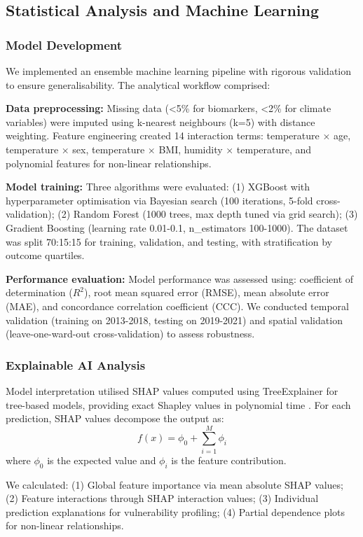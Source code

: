 \documentclass[11pt,a4paper]{article}
\begin{document}
\subsection{Statistical Analysis and Machine Learning}

\subsubsection{Model Development}

We implemented an ensemble machine learning pipeline with rigorous validation to ensure generalisability. The analytical workflow comprised:

\textbf{Data preprocessing:} Missing data (<5\% for biomarkers, <2\% for climate variables) were imputed using k-nearest neighbours (k=5) with distance weighting. Feature engineering created 14 interaction terms: temperature × age, temperature × sex, temperature × BMI, humidity × temperature, and polynomial features for non-linear relationships.

\textbf{Model training:} Three algorithms were evaluated: (1) XGBoost with hyperparameter optimisation via Bayesian search (100 iterations, 5-fold cross-validation); (2) Random Forest (1000 trees, max depth tuned via grid search); (3) Gradient Boosting (learning rate 0.01-0.1, n\_estimators 100-1000). The dataset was split 70:15:15 for training, validation, and testing, with stratification by outcome quartiles.

\textbf{Performance evaluation:} Model performance was assessed using: coefficient of determination ($R^2$), root mean squared error (RMSE), mean absolute error (MAE), and concordance correlation coefficient (CCC). We conducted temporal validation (training on 2013-2018, testing on 2019-2021) and spatial validation (leave-one-ward-out cross-validation) to assess robustness.

\subsubsection{Explainable AI Analysis}

Model interpretation utilised SHAP values computed using TreeExplainer for tree-based models, providing exact Shapley values in polynomial time \citep{Lundberg2020}. For each prediction, SHAP values decompose the output as:
$$f(x) = \phi_0 + \sum_{i=1}^{M} \phi_i$$
where $\phi_0$ is the expected value and $\phi_i$ is the feature contribution.

We calculated: (1) Global feature importance via mean absolute SHAP values; (2) Feature interactions through SHAP interaction values; (3) Individual prediction explanations for vulnerability profiling; (4) Partial dependence plots for non-linear relationships.
\end{document}
